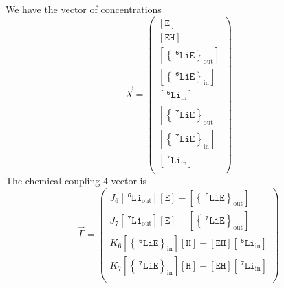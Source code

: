 \documentclass[aps,onecolumn,11pt]{revtex4}
\newcommand{\mychem}[1]{\mathtt{#1}}
\newcommand{\myconc}[1]{\left\lbrack{#1}\right\rbrack}
\newcommand{\spLi}[1]{{~^{\mychem{#1}}\mychem{Li}}}
\newcommand{\spEout}{\mychem{E}}
\newcommand{\Eout}{\myconc{\spEout}}
\newcommand{\spLiEin}[1]{\left\lbrace\spLi{#1}\spEout\right\rbrace_{\mathrm{in}}}
\newcommand{\LiEin}[1]{\myconc{\spLiEin{#1}}}
\newcommand{\spLiEout}[1]{\left\lbrace\spLi{#1}\spEout\right\rbrace_{\mathrm{out}}}
\newcommand{\LiEout}[1]{\myconc{\spLiEout{#1}}}
\newcommand{\spLiIn}[1]{{\spLi{#1}}_{\mathrm{in}}}
\newcommand{\LiIn}[1]{\myconc{\spLiIn{#1}}}
\newcommand{\spLiOut}[1]{{\spLi{#1}}_{\mathrm{out}}}
\newcommand{\LiOut}[1]{\myconc{\spLiOut{#1}}}
\newcommand{\spEHin}{\mychem{EH}}
\newcommand{\EHin}{\myconc{\spEHin}}
\newcommand{\spproton}{\mychem{H}}
\newcommand{\proton}{\myconc{\spproton}}
\begin{document}
We have the vector of concentrations
\begin{equation}
	\vec{X} = 
	\begin{pmatrix}
	\Eout\\
	\EHin\\
	\LiEout{6}\\
	\LiEin{6}\\
	\LiIn{6}\\
	\LiEout{7}\\
	\LiEin{7}\\
	\LiIn{7}\\
	\end{pmatrix}
\end{equation}
The chemical coupling 4-vector is
\begin{equation}
\vec{\Gamma} = 
\begin{pmatrix}
J_6 \LiOut{6} \Eout - \LiEout{6}\\
J_7 \LiOut{7} \Eout - \LiEout{7}\\
K_6 \LiEin{6}\proton - \EHin \LiIn{6}\\
K_7 \LiEin{7}\proton - \EHin \LiIn{7}\\
\end{pmatrix}
\end{equation}
\end{document}
